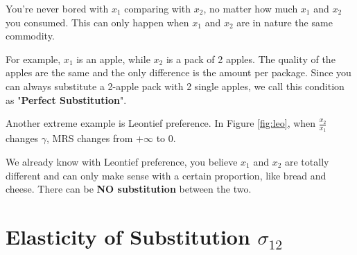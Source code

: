 \documentclass{article}
\begin{document}
\begin{mdframed}[backgroundcolor=blue!20,linecolor=white]
\begin{center}
\begin{tikzpicture}[scale=0.5]
\end{tikzpicture}
\label{fig:straight}
\end{center}
\vspace{2mm}

You're never bored with $x_1$ comparing with $x_2$, no matter how much $x_1$ and $x_2$ you consumed. This can only happen when $x_1$ and $x_2$ are in nature the same commodity. 

For example, $x_1$ is an apple, while $x_2$ is a pack of 2 apples. The quality of the apples are the same and the only difference is the amount per package. Since you can always substitute a 2-apple pack with 2 single apples, we call this condition as "\textbf{Perfect Substitution}".

\vspace{6mm}

Another extreme example is Leontief preference.  In Figure \ref{fig:leo}, when $\frac{x_2}{x_1}$ changes $\gamma$, MRS changes from $+\infty$ to $0$.

\begin{center}
\label{fig:leo}
\end{center}

We already know with Leontief preference, you believe $x_1$ and $x_2$ are totally different and can only make sense with a certain proportion, like bread and cheese. There can be \textbf{NO substitution} between the two.


\section{Elasticity of Substitution $\sigma_{12}$}


\end{mdframed}
\end{document}
